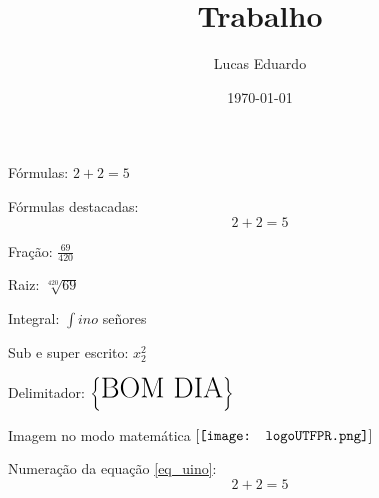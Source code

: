 \documentclass[12pt,a4paper]{article}
\author{Lucas Eduardo}
\date{\today}
\title{Trabalho}
\begin{document}
	\maketitle
	
	Fórmulas: $2 + 2 = 5$

	Fórmulas destacadas: $$2 + 2 = 5$$
	
	Fração: $\frac{69}{420}$
	
	Raiz: $\sqrt[420]{69}$
	
	Integral: $\int{ino}$  señores
	
	Sub e super escrito: $x_2^2$
	
	Delimitador: $\left\{ \mbox{\huge BOM DIA} \right\}$


	Imagem no modo matemática $
	\left[{\text{\texttt{[image: logoUTFPR.png]}}}\right]
	$
	
	Numeração da equação \ref{eq_uino}: 
	\begin{equation}
		2 + 2 = 5
		\label{eq_uino}
	\end{equation}
	
\end{document}
